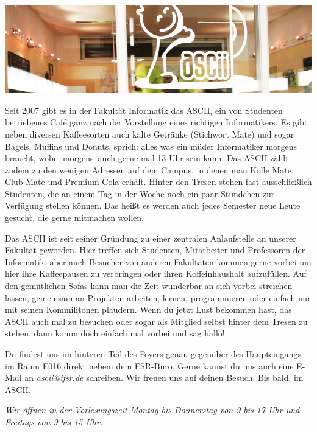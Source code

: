 
\includegraphics[width=\linewidth]{img/ascii.jpg}

Seit 2007 gibt es in der Fakultät Informatik das ASCII, ein von Studenten betriebenes Café ganz nach der Vorstellung eines richtigen Informatikers.
Es gibt neben diversen Kaffeesorten auch kalte Getränke (Stichwort Mate) und sogar Bagels, Muffins und Donuts, sprich:
alles was ein müder Informatiker morgens braucht, wobei \glqq morgens\grqq\ auch gerne mal 13 Uhr sein kann.
Das ASCII zählt zudem zu den wenigen Adressen auf dem Campus, in denen man Kolle Mate, Club Mate und Premium Cola erhält.
Hinter den Tresen stehen fast ausschließlich Studenten, die an einem Tag in der Woche noch ein paar Stündchen zur Verfügung stellen können.
Das heißt es werden auch jedes Semester neue Leute gesucht, die gerne mitmachen wollen.

Das ASCII ist seit seiner Gründung zu einer zentralen Anlaufstelle an unserer Fakultät geworden.
Hier treffen sich Studenten, Mitarbeiter und Professoren der Informatik, aber auch Besucher von anderen Fakultäten kommen gerne vorbei um hier ihre Kaffeepausen zu verbringen oder ihren Koffeinhaushalt aufzufüllen.
Auf den gemütlichen Sofas kann man die Zeit wunderbar an sich vorbei streichen lassen, gemeinsam an Projekten arbeiten, lernen, programmieren oder einfach nur mit seinen Kommilitonen plaudern.
Wenn du jetzt Lust bekommen hast, das ASCII auch mal zu besuchen oder sogar als Mitglied selbst hinter dem Tresen zu stehen, dann komm doch einfach mal vorbei und sag hallo!

Du findest uns im hinteren Teil des Foyers genau gegenüber des Haupteingangs im Raum E016 direkt nebem dem FSR-Büro. Gerne kannst du uns auch eine E-Mail an \textit{ascii@ifsr.de} schreiben.
Wir freuen uns auf deinen Besuch.
Bis bald, im ASCII.

\textit{Wir öffnen in der Vorlesungszeit Montag bis Donnerstag von 9 bis 17 Uhr und Freitags von 9 bis 15 Uhr.}
